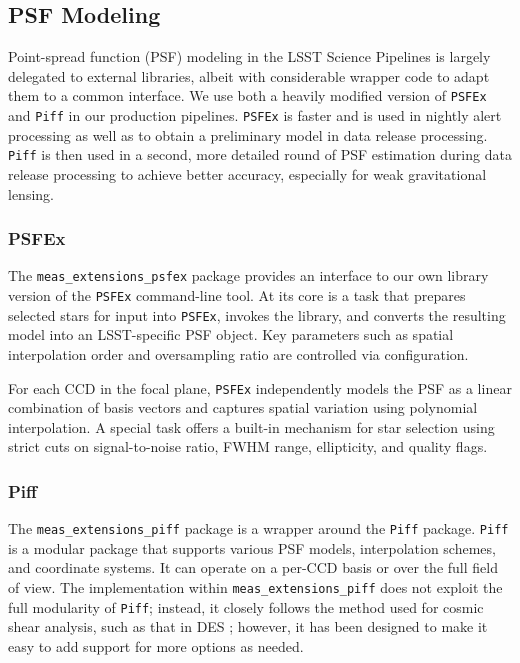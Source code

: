 \subsection{PSF Modeling}

\label{sec:psf_modeling}

Point-spread function (PSF) modeling in the LSST Science Pipelines is largely delegated to external libraries, albeit with considerable wrapper code to adapt them to a common interface.
We use both a heavily modified version of \texttt{PSFEx} \citep{2011ASPC..442..435B,2013ascl.soft01001B} and \texttt{Piff} \citep{2021ascl.soft02024J,2021MNRAS.501.1282J} in our production pipelines.
\texttt{PSFEx} is faster and is used in nightly alert processing  as well as to obtain a preliminary model in data release processing.
\texttt{Piff} is then used in a second, more detailed round of PSF estimation during data release processing to achieve better accuracy, especially for weak gravitational lensing.

\subsubsection{PSFEx}\label{sec:meas_extensions_psfex}

The \texttt{meas\_extensions\_psfex} package provides an interface to our own library version of the \texttt{PSFEx} command-line tool.
At its core is a task that prepares selected stars for input into \texttt{PSFEx}, invokes the library, and converts the resulting model into an LSST-specific PSF object.
Key parameters such as spatial interpolation order and oversampling ratio are controlled via configuration.

For each CCD in the focal plane, \texttt{PSFEx} independently models the PSF as a linear combination of basis vectors and captures spatial variation using polynomial interpolation.
A special task offers a built-in mechanism for star selection using strict cuts on signal-to-noise ratio, FWHM range, ellipticity, and quality flags.

\subsubsection{Piff}
\label{sec:meas_extensions_piff}

The \texttt{meas\_extensions\_piff} package is a wrapper around the \texttt{Piff} package.
\texttt{Piff} is a modular package that supports various PSF models, interpolation schemes, and coordinate systems.
It can operate on a per-CCD basis or over the full field of view.
The implementation within  \texttt{meas\_extensions\_piff} does not exploit the full modularity of \texttt{Piff}; instead, it closely follows the method used for cosmic shear analysis, such as that in DES \citep{2021MNRAS.501.1282J,2025OJAp....8E..26S}; however, it has been designed to make it easy to add support for more options as needed.

